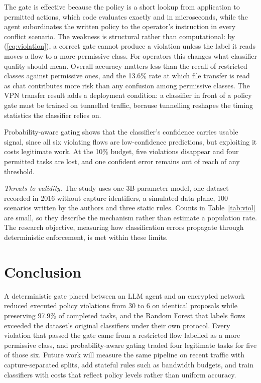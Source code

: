 \documentclass[conference]{IEEEtran}
\begin{document}
The gate is effective because the policy is a short lookup from application to permitted actions, which code evaluates exactly and in microseconds, while the agent subordinates the written policy to the operator's instruction in every conflict scenario. The weakness is structural rather than computational: by (\ref{eq:violation}), a correct gate cannot produce a violation unless the label it reads moves a flow to a more permissive class. For operators this changes what classifier quality should mean. Overall accuracy matters less than the recall of restricted classes against permissive ones, and the 13.6\% rate at which file transfer is read as chat contributes more risk than any confusion among permissive classes. The VPN transfer result adds a deployment condition: a classifier in front of a policy gate must be trained on tunnelled traffic, because tunnelling reshapes the timing statistics the classifier relies on.

Probability-aware gating shows that the classifier's confidence carries usable signal, since all six violating flows are low-confidence predictions, but exploiting it costs legitimate work. At the 10\% budget, five violations disappear and four permitted tasks are lost, and one confident error remains out of reach of any threshold.

\textit{Threats to validity.} The study uses one 3B-parameter model, one dataset recorded in 2016 without capture identifiers, a simulated data plane, 100 scenarios written by the authors and three static rules. Counts in Table~\ref{tab:viol} are small, so they describe the mechanism rather than estimate a population rate. The research objective, measuring how classification errors propagate through deterministic enforcement, is met within these limits.

\section{Conclusion}

A deterministic gate placed between an LLM agent and an encrypted network reduced executed policy violations from 30 to 6 on identical proposals while preserving 97.9\% of completed tasks, and the Random Forest that labels flows exceeded the dataset's original classifiers under their own protocol. Every violation that passed the gate came from a restricted flow labelled as a more permissive class, and probability-aware gating traded four legitimate tasks for five of those six. Future work will measure the same pipeline on recent traffic with capture-separated splits, add stateful rules such as bandwidth budgets, and train classifiers with costs that reflect policy levels rather than uniform accuracy.
\end{document}
